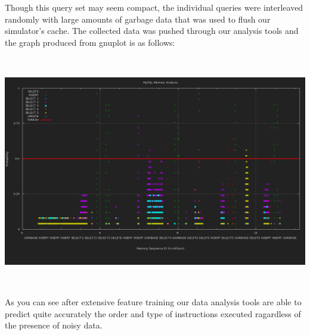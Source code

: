 \documentclass[11pt, oneside]{article}
\begin{document}
Though this query set may seem compact, the individual queries were interleaved
randomly with large amounts of garbage data that was used to flush our simulator's
cache. The collected data was pushed through our analysis tools and the graph 
produced from gnuplot is as follows:

\includegraphics[height=4in, width=6.5in]{MySQLAnal.png}

As you can see after extensive feature training our data analysis tools are able to
predict quite accurately the order and type of instructions executed ragardless of 
the presence of noisy data.
\end{document}
